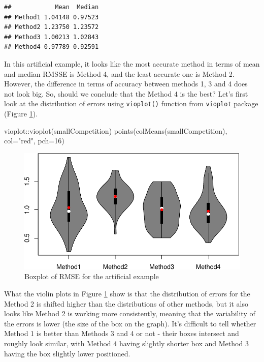 \documentclass[
]{book}
\newenvironment{Shaded}{\begin{snugshade}}{\end{snugshade}}
\newcommand{\AttributeTok}[1]{\textcolor[rgb]{0.77,0.63,0.00}{#1}}
\newcommand{\DecValTok}[1]{\textcolor[rgb]{0.00,0.00,0.81}{#1}}
\newcommand{\FunctionTok}[1]{\textcolor[rgb]{0.00,0.00,0.00}{#1}}
\newcommand{\NormalTok}[1]{#1}
\newcommand{\SpecialCharTok}[1]{\textcolor[rgb]{0.00,0.00,0.00}{#1}}
\newcommand{\StringTok}[1]{\textcolor[rgb]{0.31,0.60,0.02}{#1}}
\theoremstyle{definition}
\theoremstyle{definition}
\theoremstyle{definition}
\theoremstyle{definition}
\theoremstyle{remark}
\begin{document}
\begin{verbatim}
##            Mean  Median
## Method1 1.04148 0.97523
## Method2 1.23750 1.23572
## Method3 1.00213 1.02843
## Method4 0.97789 0.92591
\end{verbatim}

In this artificial example, it looks like the most accurate method in terms of mean and median RMSSE is Method 4, and the least accurate one is Method 2. However, the difference in terms of accuracy between methods 1, 3 and 4 does not look big. So, should we conclude that the Method 4 is the best? Let's first look at the distribution of errors using \texttt{vioplot()} function from \texttt{vioplot} package (Figure \ref{fig:smallCompetitionBoxplot}).

\begin{Shaded}
\begin{Highlighting}[]
\NormalTok{vioplot}\SpecialCharTok{::}\FunctionTok{vioplot}\NormalTok{(smallCompetition)}
\FunctionTok{points}\NormalTok{(}\FunctionTok{colMeans}\NormalTok{(smallCompetition), }\AttributeTok{col=}\StringTok{"red"}\NormalTok{, }\AttributeTok{pch=}\DecValTok{16}\NormalTok{)}
\end{Highlighting}
\end{Shaded}

\begin{figure}
\centering
\includegraphics{adam_files/figure-latex/smallCompetitionBoxplot-1.pdf}
\caption{\label{fig:smallCompetitionBoxplot}Boxplot of RMSE for the artificial example}
\end{figure}

What the violin plots in Figure \ref{fig:smallCompetitionBoxplot} show is that the distribution of errors for the Method 2 is shifted higher than the distributions of other methods, but it also looks like Method 2 is working more consistently, meaning that the variability of the errors is lower (the size of the box on the graph). It's difficult to tell whether Method 1 is better than Methods 3 and 4 or not - their boxes intersect and roughly look similar, with Method 4 having slightly shorter box and Method 3 having the box slightly lower positioned.
\end{document}
